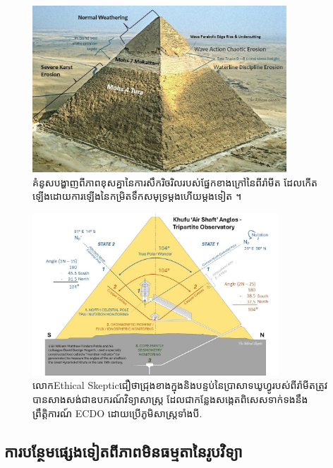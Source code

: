 \documentclass[10pt,twocolumn,letterpaper]{article}
\begin{document}
\begin{figure}[t]
\begin{center}
\includegraphics[width=0.85\textwidth]{khafre.jpg}
\end{center}
   \caption{គំនូសបង្ហាញពីភាពខុសគ្នានៃការសឹករិចរិលរបស់ផ្នែកខាងក្រៅនៃពីរ៉ាមីត ដែលកើតឡើងដោយការឡើងនៃកម្រិតទឹកសមុទ្រម្តងហើយម្តងទៀត \cite{27}។}
\label{fig:4}
\end{figure}

\begin{figure}[t]
\begin{center}
\includegraphics[width=0.82\textwidth]{shafts.jpg}
\end{center}
   \caption{លោកEthical Skepticជឿថាជ្រុងខាងក្នុងនិងបន្ទប់នៃប្រាសាទឃូហ្វូរបស់ពីរ៉ាមីតត្រូវបានសាងសង់ជាឧបករណ៍វិទ្យាសាស្ត្រ ដែលជាកន្លែងសង្កេតពិសេសទាក់ទងនឹងព្រឹត្តិការណ៍ ECDO ដោយប្រើភូមិសាស្ត្រទាំងបី\cite{28}.}
\label{fig:5}
\end{figure}

\subsection{ការបន្ថែមផ្សេងទៀតពីភាពមិនធម្មតានៃរូបវិទ្យា}
\end{document}
